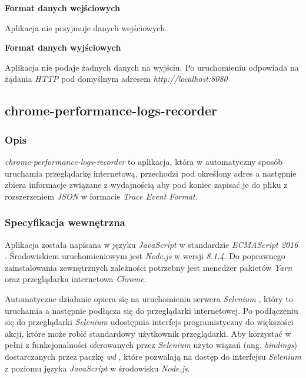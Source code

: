 \documentclass[polish, twoside, 12pt]{mwart}
\begin{document}
\textbf{Format danych wejściowych} \newline

Aplikacja nie przyjmuje danych wejściowych. \newline

\textbf{Format danych wyjściowych} \newline

Aplikacja nie podaje żadnych danych na wyjściu. Po uruchomieniu odpowiada na żądania \emph{HTTP} pod domyślnym adresem \emph{http://localhost:8080}

\subsection{chrome-performance-logs-recorder}

\subsubsection{Opis}

\emph{chrome-performance-logs-recorder} to aplikacja, która w automatyczny sposób uruchamia przeglądarkę internetową, przechodzi pod określony adres a następnie zbiera informacje związane z wydajnością aby pod koniec zapisać je do pliku z rozszerzeniem \emph{JSON} w formacie \emph{Trace Event Format}.

\subsubsection{Specyfikacja wewnętrzna}

Aplikacja została napisana w języku \emph{JavaScript} w standardzie \emph{ECMAScript 2016} \cite{es2016}. Środowiskiem uruchomieniowym jest \emph{Node.js} \cite{node.js} w wersji \emph{8.1.4}. Do poprawnego zainstalowania zewnętrznych zależności potrzebny jest menedżer pakietów \emph{Yarn} \cite{yarn} oraz przeglądarka internetowa \emph{Chrome}.

Automatyczne działanie opiera się na uruchomieniu serwera \emph{Selenium} \cite{selenium}, który to uruchamia a następnie podłącza się do przeglądarki internetowej. Po podłączeniu się do przeglądarki \emph{Selenium} udostępnia interfejs programistyczny do większości akcji, które może robić standardowy użytkownik przeglądarki. Aby korzystać w pełni z funkcjonalności oferowanych przez \emph{Selenium} użyto wiązań (ang. \emph{bindings}) dostarczanych przez paczkę \emph{wd} \cite{wd}, które pozwalają na dostęp do interfejsu \emph{Selenium} z poziomu języka \emph{JavaScript} w środowisku \emph{Node.js}.
\end{document}

